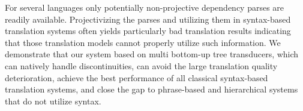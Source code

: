 For several languages only potentially non-projective dependency parses are readily available.  Projectivizing the parses and utilizing them in syntax-based translation systems often yields particularly bad translation results indicating that those translation models cannot properly utilize such information.  We   demonstrate that our system based on multi bottom-up tree transducers, which can natively handle discontinuities, can avoid the large translation quality deterioration, achieve the best performance of all classical syntax-based translation systems, and close the gap to phrase-based and hierarchical systems that do not utilize syntax.
